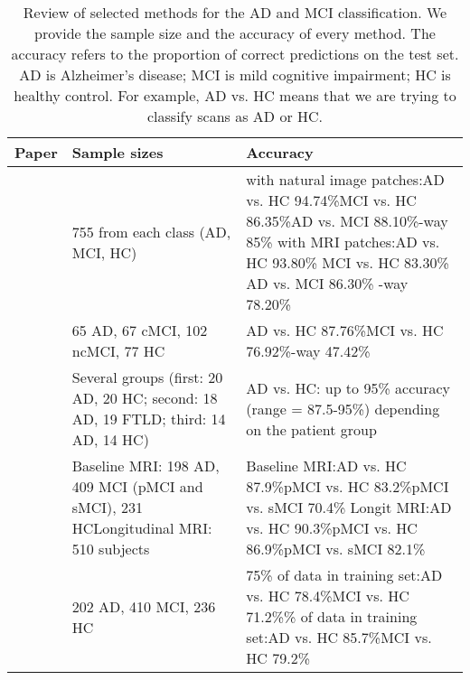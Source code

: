 \documentclass[a4paper,10pt]{article}
\begin{document}
\begin{table*}
\centering
\caption{Review of selected methods for the AD and MCI classification. We provide the sample size and the accuracy of every method. The accuracy refers to the proportion of correct predictions on the test set. AD is Alzheimer's disease; MCI is mild cognitive impairment; HC is healthy control. For example, AD vs. HC means that we are trying to classify scans as AD or HC.}
\label{review}
\begin{tabular}{p{30mm} | p{50mm} | p{65mm}}
	\textbf{Paper} & \textbf{Sample sizes} & \textbf{Accuracy} \\ \hline
	\cite{gupta} & 755 from each class (AD, MCI, HC) & with natural image patches:\newline AD vs. HC 94.74\%\newline MCI vs. HC 86.35\%\newline AD vs. MCI 88.10\%\newline 3-way 85\% \newline with MRI patches:\newline AD vs. HC 93.80\% \newline MCI vs. HC 83.30\% \newline AD vs. MCI 86.30\% \newline 3-way 78.20\% \\ \hline
	\cite{sydney} & 65 AD, 67 cMCI, 102 ncMCI, 77 HC & AD vs. HC 87.76\%\newline MCI vs. HC 76.92\%\newline 4-way 47.42\% \\ \hline
	\cite{kloppel} & Several groups (first: 20 AD, 20 HC; second: 18 AD, 19 FTLD; third: 14 AD, 14 HC) & AD vs. HC: up to 95\% accuracy (range = 87.5-95\%) depending on the patient group\\ \hline
	\cite{montana} & Baseline MRI: 198 AD, 409 MCI (pMCI and sMCI), 231 HC\newline Longitudinal MRI: 510 subjects & Baseline MRI:\newline AD vs. HC 87.9\%\newline pMCI vs. HC 83.2\%\newline pMCI vs. sMCI 70.4\%\newline
Longit MRI:\newline AD vs. HC 90.3\%\newline pMCI vs. HC 86.9\%\newline pMCI vs. sMCI 82.1\% \\ \hline
	\cite{ica} & 202 AD, 410 MCI, 236 HC & 75\% of data in training set:\newline AD vs. HC 78.4\%\newline MCI vs. HC 71.2\%\newline 90\% of data in training set:\newline AD vs. HC 85.7\%\newline MCI vs. HC 79.2\% \\ \hline

\end{tabular}
\end{table*}
\end{document}
